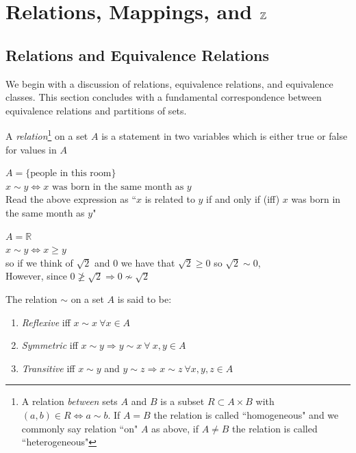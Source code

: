 


\chapter{\texorpdfstring{Relations, Mappings, and ${\mathbb{ Z}}$}{Relations, Mappings, and Z (integers)}}
\vspace{-0.25 in}
\section{Relations and Equivalence Relations}
We begin with a discussion of relations, equivalence relations, and equivalence classes. This section concludes with a fundamental correspondence between equivalence relations and partitions of sets.
\begin{definition}[Relations]
A \textit{relation}\footnote{
    A relation \textit{between} sets $A$ and $B$ is a subset $R\subset A\times B$ with $(a,b)\in R \iff a\sim b $. If $A=B$ the relation is called ``homogeneous" and we commonly say relation ``on" $A$ as above, if $A\neq B$ the relation is called ``heterogeneous"
} on a set $A$ is a statement in two variables which is either true or false for values in $A$
\end{definition}
\begin{example}
\label{ex:firstExample}
$A=\{\text{people in this room}\}$\\
$x\sim y \Leftrightarrow x \text{ was born in the same month as } y$\\
Read the above expression as ``$x$ is related to $y$ if and only if (iff) $x$ was born in the same month as $y$"
\end{example}
\begin{example}
    \label{ex:secondExample}
$A=\mathbb{R}$\\
$x\sim y \Leftrightarrow x \geq y$\\
so if we think of $\sqrt{2}$ and $0$ we have that $\sqrt{2}\geq 0$ so $\sqrt{2}\sim 0$, \\
However, since $0 \not\geq \sqrt{2} \Rightarrow 0\not\sim \sqrt{2}$
\end{example}
\begin{definition}
The relation $\sim$ on a set $A$ is said to be:
\begin{enumerate}[label=\roman*)]
    \item \textit{Reflexive} iff $x\sim x \ \forall x \in A$
    \item \textit{Symmetric} iff $x\sim y \Rightarrow y\sim x \ \forall \ x,y \in A$
    \item \textit{Transitive} iff $x\sim y$ and $y\sim z \Rightarrow x\sim z \ \forall x,y,z \in A$
\end{enumerate}
\end{definition}
